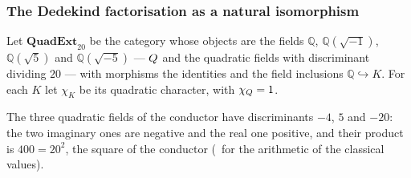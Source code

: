 \subsubsection{The Dedekind factorisation as a natural isomorphism}
\label{ssec:dedekind-natural}

\begin{definition}\label{def:QuadExt}
Let $\mathbf{QuadExt}_{20}$ be the category whose objects are the
fields $\mathbb{Q}$, $\mathbb{Q}(\sqrt{-1})$, $\mathbb{Q}(\sqrt{5})$ and
$\mathbb{Q}(\sqrt{-5})$ --- $Q$ and the quadratic fields with discriminant dividing
$20$ --- with morphisms the identities and the field inclusions
$\mathbb{Q}\hookrightarrow K$.  For each $K$ let $\chi_K$ be its quadratic character, with $\chi_{Q}=1$.
\end{definition}

The three quadratic fields of the conductor have discriminants $-4$, $5$ and $-20$: the
two imaginary ones are negative and the real one positive, and their product is
$400=20^2$, the square of the conductor (\ for the arithmetic of the classical values).


